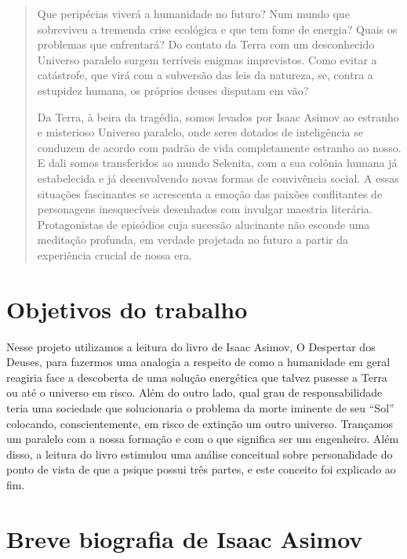 \documentclass[14pt,portuguese]{extreport}
\begin{document}
      \begin{quotation}
      	Que peripécias viverá a humanidade no futuro? Num mundo que sobreviveu a
      	tremenda crise ecológica e que tem fome de energia? Quais os problemas que
      	enfrentará? Do contato da Terra com um desconhecido Universo paralelo
      	surgem terríveis enigmas imprevistos. Como evitar a catástrofe, que virá com a
      	subversão das leis da natureza, se, contra a estupidez humana, os próprios
      	deuses disputam em vão?
      	
      	Da Terra, à beira da tragédia, somos levados por Isaac Asimov ao estranho e
      	misterioso Universo paralelo, onde seres dotados de inteligência se conduzem
      	de acordo com padrão de vida completamente estranho ao nosso. E dali somos
      	transferidos ao mundo Selenita, com a sua colônia humana já estabelecida e já
      	desenvolvendo novas formas de convivência social. A essas situações
      	fascinantes se acrescenta a emoção das paixões conflitantes de personagens
      	inesquecíveis desenhados com invulgar maestria literária. Protagonistas de
      	episódios cuja sucessão alucinante não esconde uma meditação profunda, em
      	verdade projetada no futuro a partir da experiência crucial de nossa era.
      \end{quotation}

    \section{Objetivos do trabalho}
    
      Nesse projeto utilizamos a leitura do livro de Isaac Asimov, O
      Despertar dos Deuses, para fazermos uma analogia a respeito de
      como a humanidade em geral reagiria face a descoberta de uma
      solução energética que talvez pusesse a Terra ou até o universo em
      risco. Além do outro lado, qual grau de responsabilidade teria uma
      sociedade que solucionaria o problema da morte iminente de seu
      “Sol” colocando, conscientemente, em risco de extinção um outro
      universo. Trançamos um paralelo com a nossa formação e com o
      que significa ser um engenheiro. Além disso, a leitura do livro
      estimulou uma análise conceitual sobre personalidade do ponto de
      vista de que a psique possui três partes, e este conceito foi
      explicado ao fim.
      
    \section{Breve biografia de Isaac Asimov}
    
\end{document}
